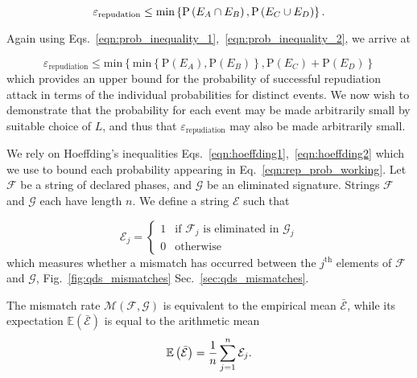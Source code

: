 \begin{equation}
\varepsilon_{\text{repudation}} \le \text{min}\left\{\text{P}\left(E_A \cap E_B\right), \text{P}\left(E_C \cup E_D\right)\right\}. \notag
\end{equation}

\noindent Again using Eqs.~\ref{eqn:prob_inequality_1},~\ref{eqn:prob_inequality_2}, we arrive at

\begin{equation}\label{eqn:rep_prob_working}
\varepsilon_{\text{repudiation}} \le \text{min}\left\{
\text{min}\left\{\text{P}\left(E_A\right), \text{P}\left(E_B\right) \right\}, \text{P}\left(E_C\right) + \text{P}\left(E_D\right)\right\}
\end{equation}
which provides an upper bound for the probability of successful repudiation attack in terms of the individual probabilities for distinct events. We now wish to demonstrate that the probability for each event may be made arbitrarily small by suitable choice of $L$, and thus that $\varepsilon_{\text{repudiation}}$ may also be made arbitrarily small.


We rely on Hoeffding's inequalities Eqs.~\ref{eqn:hoeffding1},~\ref{eqn:hoeffding2} which we use to bound each probability appearing in Eq.~\ref{eqn:rep_prob_working}. Let $\mathcal{F}$ be a string of declared phases, and $\mathcal{G}$ be an eliminated signature. Strings $\mathcal{F}$ and $\mathcal{G}$ each have length $n$. We define a string $\mathcal{E}$ such that

\begin{equation*}\label{eqn:error}
\mathcal{E}_j = 
\begin{cases}
1 & \text{if $\mathcal{F}_j$ is eliminated in $\mathcal{G}_j$} \\
0 & \text{otherwise}
\end{cases}
\end{equation*}
which measures whether a mismatch has occurred between the $j^\text{th}$ elements of $\mathcal{F}$ and $\mathcal{G}$, Fig.~\ref{fig:qds_mismatches} Sec.~\ref{sec:qds_mismatches}.


The mismatch rate $\mathcal{M}\left(\mathcal{F}, \mathcal{G}\right)$ is equivalent to the empirical mean $\bar{\mathcal{E}}$, while its expectation $\mathbb{E}\left(\bar{\mathcal{E}}\right)$ is equal to the arithmetic mean
\begin{equation}
\mathbb{E}\left(\bar{\mathcal{E}}\right) = \frac{1}{n} \sum_{j=1}^n \mathcal{E}_j. \notag
\end{equation}

